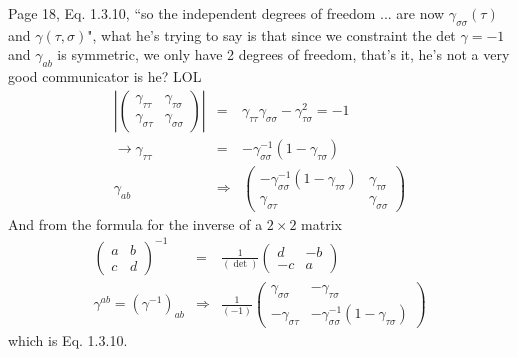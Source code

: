 \documentclass[aps,preprint,preprintnumbers,nofootinbib,showpacs,prd]{revtex4-1}
\newcommand{\nbea}{\begin{eqnarray*}}
\newcommand{\neea}{\end{eqnarray*}}
\begin{document}
Page 18, Eq. 1.3.10, ``so the independent degrees of freedom ... are now $\gamma_{\sigma\sigma}(\tau)$ and $\gamma(\tau,\sigma)$", what he's trying to say is that since we constraint the det $\gamma = -1$ and $\gamma_{ab}$ is symmetric, we only have 2 degrees of freedom, that's it, he's not a very good communicator is he? LOL
%
\nbea
\left | \left ( \begin{array}{ll}
\gamma_{\tau\tau} & \gamma_{\tau\sigma} \\
\gamma_{\sigma\tau} & \gamma_{\sigma\sigma}
\end{array} \right ) \right | & = &
\gamma_{\tau\tau}\gamma_{\sigma\sigma} - \gamma_{\tau\sigma}^2 = -1 \\
\rightarrow \gamma_{\tau\tau} & = & -\gamma_{\sigma\sigma}^{-1}(1 - \gamma_{\tau\sigma}) \\
\gamma_{ab} & \Rightarrow &
\left ( \begin{array}{cc}
 -\gamma_{\sigma\sigma}^{-1}(1 - \gamma_{\tau\sigma}) & \gamma_{\tau\sigma} \\
\gamma_{\sigma\tau} & \gamma_{\sigma\sigma}
\end{array} \right ) 
\neea
%
And from the formula for the inverse of a $2 \times 2$ matrix
%
\nbea
\left ( \begin{array}{cc}
a & b \\
c & d
\end{array} \right )^{-1} & = &
\frac{1}{(\det)} \left ( \begin{array}{cc}
d & -b \\
-c & a
\end{array} \right ) \\
\gamma^{ab} = (\gamma^{-1})_{ab} & \Rightarrow & \frac{1}{(-1)} \left ( \begin{array}{cc}
\gamma_{\sigma\sigma} & -\gamma_{\tau\sigma} \\
-\gamma_{\sigma\tau} &  -\gamma_{\sigma\sigma}^{-1}(1 - \gamma_{\tau\sigma})
\end{array} \right ) 
\neea
%
which is Eq. 1.3.10.
\end{document}
